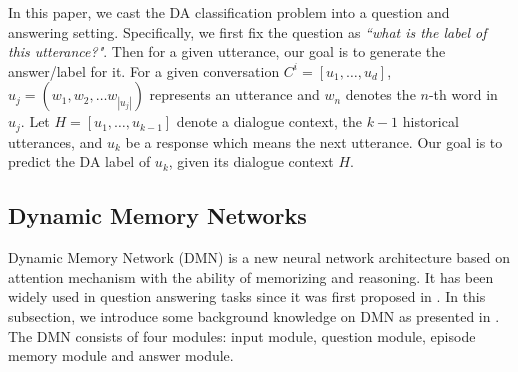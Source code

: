 \documentclass[conference]{IEEEtran}
\begin{document}
In this paper, we cast the DA classification problem into a question and answering setting. Specifically, we first fix the question as \textit{``what is the label of this utterance?"}. Then for a given utterance, our goal is to generate the answer/label for it. For a given conversation $C^i=[u_1, \ldots, u_d]$, $u_j = (w_1, w_2, \ldots w_{|u_j|})$ represents an utterance and $w_n$ denotes the $n$-th word in $u_j$. Let $H=[u_1, \ldots, u_{k-1}]$ denote a dialogue context, the $k-1$ historical utterances, and $u_k$ be a response which means the next utterance. Our goal is to predict the DA label of $u_k$, given its dialogue context $H$.
	
	\subsection{Dynamic Memory Networks}
	Dynamic Memory Network (DMN) is a new neural network architecture based on attention mechanism with the ability of memorizing and reasoning. It has been widely used in question answering tasks since it was first proposed in \cite{kumar2016ask}. In this subsection, we introduce some background knowledge on DMN as presented in \cite{kumar2016ask}. The DMN consists of four modules: input module, question module, episode memory module and answer module. 
	
\end{document}
